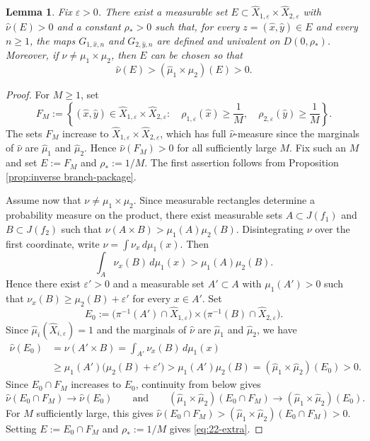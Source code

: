 \documentclass[11pt]{amsart}
\numberwithin{equation}{section}
\theoremstyle{plain}
\newtheorem{lem}[thm]{Lemma}
\theoremstyle{definition}
\theoremstyle{remark}
\begin{document}
\begin{lem}\label{prop:good-pairs-good-times}
Fix $\varepsilon>0$. 
There exist a measurable set
$E\subset\hat X_{1,\varepsilon}\times
\hat X_{2,\varepsilon}$ with $\hat\nu(E)>0$ and a constant
$\rho_*>0$ such that, for every
$z=(\hat x,\hat y)\in E$ and every $n\geq1$, the maps
$G_{1,\hat x,n}$ and $G_{2,\hat y,n}$ are defined and
univalent on $D(0,\rho_*)$.
Moreover, if $\nu\neq\mu_1\times\mu_2$, then $E$ can be chosen so
that
\begin{equation}\label{eq:22-extra}
\hat\nu(E)>
(\hat\mu_1\times\hat\mu_2)(E)>0.
\end{equation}
\end{lem}

\begin{proof}
For $M\geq1$, set
$$
F_M:=
\left\{
(\hat x,\hat y)\in
\hat X_{1,\varepsilon}\times\hat X_{2,\varepsilon}:
\quad
\rho_{1,\varepsilon}(\hat x)\geq\frac1M,\quad
\rho_{2,\varepsilon}(\hat y)\geq\frac1M
\right\}.
$$
The sets $F_M$ increase to
$\hat X_{1,\varepsilon}\times\hat X_{2,\varepsilon}$,
which has full $\hat\nu$-measure since the marginals of
$\hat\nu$ are $\hat\mu_1$ and $\hat\mu_2$.
Hence $\hat\nu(F_M)>0$ for all sufficiently large $M$.
Fix such an $M$
and set
$E:=F_M$ and
$\rho_*:=1/M$.
The first assertion
follows from Proposition
\ref{prop:inverse branch-package}.

Assume now that $\nu\neq\mu_1\times\mu_2$. 
Since measurable
rectangles determine a probability measure on the product,
there exist
measurable sets $A\subset J(f_1)$ and $B\subset J(f_2)$ such that
$\nu(A\times B)>\mu_1(A)\mu_2(B)$.
Disintegrating $\nu$ over the first coordinate, write
$\nu=\int\nu_x\,d\mu_1(x)$.
Then
$$
\int_A\nu_x(B)\,d\mu_1(x)>\mu_1(A)\mu_2(B).
$$
Hence there exist $\varepsilon'>0$ and a measurable set
$A'\subset A$ with $\mu_1(A')>0$ such that
$\nu_x(B)\geq\mu_2(B)+\varepsilon'$
for every $x\in A'$.
Set
$$
E_0:=
\bigl(\pi^{-1}(A')\cap\hat X_{1,\varepsilon}\bigr)
\times
\bigl(\pi^{-1}(B)\cap\hat X_{2,\varepsilon}\bigr).
$$
Since $\hat\mu_i(\hat X_{i,\varepsilon})=1$ and the
marginals of $\hat\nu$ are $\hat\mu_1$ and
$\hat\mu_2$, 
we have
$$
\begin{aligned}
\hat\nu(E_0)
& =\nu(A'\times B)
 =\int_{A'}\nu_x(B)\,d\mu_1(x) \\
& \geq
\mu_1(A')\bigl(\mu_2(B)+\varepsilon'\bigr)
 >
\mu_1(A')\mu_2(B) 
=
(\hat\mu_1\times\hat\mu_2)(E_0)>0.
\end{aligned}
$$
Since $E_0\cap F_M$ increases to $E_0$, continuity from below gives
$$\hat\nu(E_0\cap F_M)\to\hat\nu(E_0)
\qquad
\text{and}\qquad
(\hat\mu_1\times\hat\mu_2)(E_0\cap F_M)
\to
(\hat\mu_1\times\hat\mu_2)(E_0).
$$
For $M$ sufficiently large, this gives
$\hat\nu(E_0\cap F_M)>
(\hat\mu_1\times\hat\mu_2)(E_0\cap F_M)>0$.
Setting
$E:=E_0\cap F_M$ and $\rho_*:=1/M$
gives 
\eqref{eq:22-extra}.
\end{proof}
\end{document}
